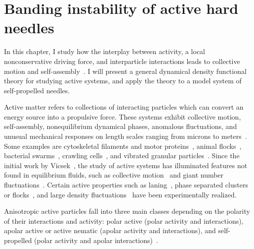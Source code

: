 \chapter{Banding instability of active hard needles}\label{ch06_active_matter}
In this chapter, I study how the interplay between activity, a local
nonconservative driving force, and interparticle interactions leads to
collective motion and self-assembly~\cite{marchetti_hydrodynamics_13}.  I will
present a general dynamical density functional theory for studying active
systems, and apply the theory to a model system of self-propelled needles. 

Active matter refers to collections of interacting particles which can convert
an energy source into a propulsive force. These systems exhibit collective
motion, self-assembly, nonequilibrium dynamical phases, anomalous fluctuations,
and unusual mechanical responses on length scales ranging from microns to
meters~\cite{marchetti_hydrodynamics_13}. Some examples are cytoskeletal
filaments and motor proteins~\cite{nedelec_selforganization_97}, animal
flocks~\cite{cavagna_scalefree_10}, bacterial swarms~\cite{zhang_collective_10,
  cisneros_dynamics_11,thutupalli_directional_15}, crawling
cells~\cite{rappel_selforganized_99}, and vibrated granular
particles~\cite{kudrolli_swarming_08, narayan_longlived_07,
  deseigne_collective_10}.  Since the initial work by
Vicsek~\cite{vicsek_novel_95}, the study of active systems has illuminated
features not found in equilibrium fluids, such as collective
motion~\cite{toner_longrange_95, toner_flocks_98, peruani_kinetic_13,
  peruani_nonequilibrium_06, wensink_emergent_12, mccandlish_spontaneous_12,
  gregoire_onset_04, chate_collective_08, ginelli_largescale_10,
  deseigne_collective_10, kuan_hysteresis_15, gao_multiscale_15,
  mishra_fluctuations_10, gopinath_dynamical_12, peshkov_nonlinear_12} and giant
number fluctuations~\cite{simha_hydrodynamic_02, ramaswamy_active_03,
  chate_collective_08, chate_simple_06,
  mccandlish_spontaneous_12,menzel_unidirectional_13}.  Certain active
properties such as laning~\cite{sutterlin_dynamics_09, leunissen_ionic_05,
  vissers_lane_11}, phase separated clusters or flocks~\cite{palacci_living_13,
  theurkauff_dynamic_12,buttinoni_dynamical_13}, and large density
fluctuations~\cite{narayan_longlived_07, zhang_collective_10} have been
experimentally realized.

Anisotropic active particles fall into three main classes depending on the
polarity of their interactions and activity: polar active (polar activity and
interactions), apolar active or active nematic (apolar activity and
interactions), and self-propelled (polar activity and apolar
interactions)~\cite{baskaran_selfregulation_12,marchetti_hydrodynamics_13}. 

